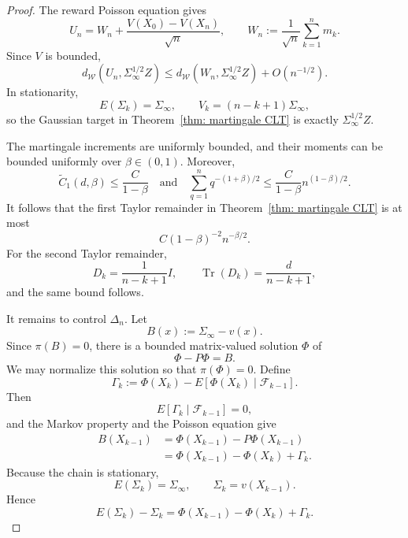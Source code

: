 \documentclass[10pt,a4paper]{article}
\begin{document}
\begin{proof}
The reward Poisson equation gives
\[
U_n=W_n+\frac{V(X_0)-V(X_n)}{\sqrt n},
\qquad
W_n:=\frac1{\sqrt n}\sum_{k=1}^n m_k.
\]
Since $V$ is bounded,
\[
d_{\mathcal W}(U_n,\Sigma_\infty^{1/2}Z)
\leq
d_{\mathcal W}(W_n,\Sigma_\infty^{1/2}Z)+O(n^{-1/2}).
\]
In stationarity,
\[
E(\Sigma_k)=\Sigma_\infty,
\qquad
V_k=(n-k+1)\Sigma_\infty,
\]
so the Gaussian target in Theorem~\ref{thm: martingale CLT} is exactly
$\Sigma_\infty^{1/2}Z$.

The martingale increments are uniformly bounded, and their moments can be
bounded uniformly over $\beta\in(0,1)$. Moreover,
\[
\tilde C_1(d,\beta)\leq \frac{C}{1-\beta}
\quad\text{and}\quad
\sum_{q=1}^n q^{-(1+\beta)/2}
\leq \frac{C}{1-\beta}n^{(1-\beta)/2}.
\]
It follows that the first Taylor remainder in
Theorem~\ref{thm: martingale CLT} is at most
\[
C(1-\beta)^{-2}n^{-\beta/2}.
\]
For the second Taylor remainder,
\[
D_k=\frac1{n-k+1}I,
\qquad
\operatorname{Tr}(D_k)=\frac{d}{n-k+1},
\]
and the same bound follows.

It remains to control $\Delta_n$. Let
\[
B(x):=\Sigma_\infty-v(x).
\]
Since $\pi(B)=0$, there is a bounded matrix-valued solution $\Phi$ of
\[
\Phi-P\Phi=B.
\]
We may normalize this solution so that $\pi(\Phi)=0$. Define
\[
\Gamma_k
:=
\Phi(X_k)-E[\Phi(X_k)\mid\mathcal F_{k-1}].
\]
Then
\[
E[\Gamma_k\mid\mathcal F_{k-1}]=0,
\]
and the Markov property and the Poisson equation give
\begin{align*}
B(X_{k-1})
&=
\Phi(X_{k-1})-P\Phi(X_{k-1})
\\
&=
\Phi(X_{k-1})-\Phi(X_k)+\Gamma_k.
\end{align*}
Because the chain is stationary,
\[
E(\Sigma_k)=\Sigma_\infty,
\qquad
\Sigma_k=v(X_{k-1}).
\]
Hence
\begin{equation}
\label{eq: stationary_covariance_poisson_decomposition}
E(\Sigma_k)-\Sigma_k
=
\Phi(X_{k-1})-\Phi(X_k)+\Gamma_k.
\end{equation}


\end{proof}
\end{document}
